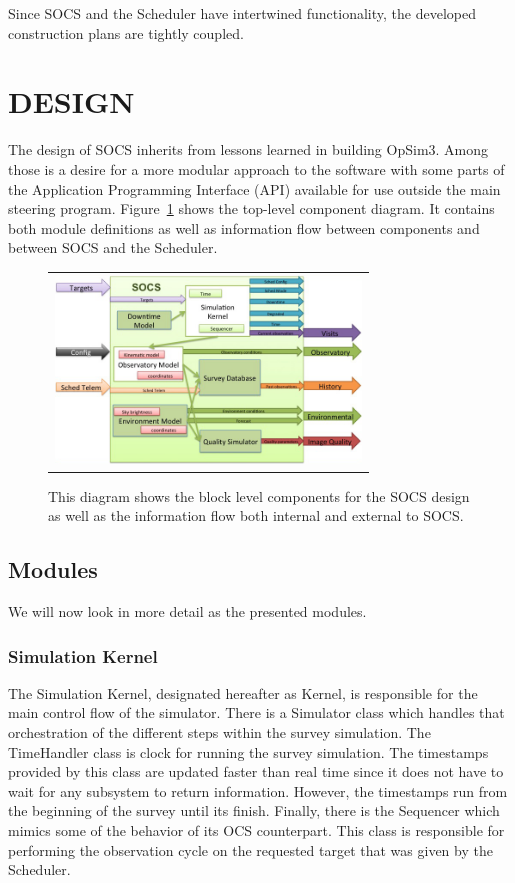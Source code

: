 \documentclass[]{spie}  %
\begin{document}
Since SOCS and the Scheduler have intertwined functionality, the developed construction plans are tightly coupled. 

\section{DESIGN}

The design of SOCS inherits from lessons learned in building OpSim3. Among those is a desire for a more modular approach to the software with some parts of the Application Programming Interface (API) available for use outside the main steering program. Figure~\ref{fig:comparch} shows the top-level component diagram. It contains both module definitions as well as information flow between components and between SOCS and the Scheduler.

\begin{figure} [ht]
\begin{center}
\begin{tabular}{c}
\includegraphics[height=5cm]{CompArch.png}
\end{tabular}
\end{center}
\caption[example]
{ \label{fig:comparch} 
This diagram shows the block level components for the SOCS design as well as the information flow both internal and external to SOCS.}
\end{figure}

\subsection{Modules}

We will now look in more detail as the presented modules.

\subsubsection{Simulation Kernel}

The Simulation Kernel, designated hereafter as Kernel, is responsible for the main control flow of the simulator. There is a Simulator class which handles that orchestration of the different steps within the survey simulation. The TimeHandler class is clock for running the survey simulation. The timestamps provided by this class are updated faster than real time since it does not have to wait for any subsystem to return information. However, the timestamps run from the beginning of the survey until its finish. Finally, there is the Sequencer which mimics some of the behavior of its OCS counterpart. This class is responsible for performing the observation cycle on the requested target that was given by the Scheduler. 
\end{document}
